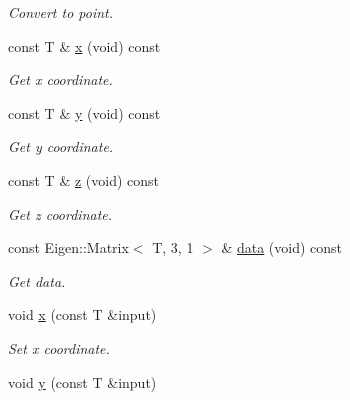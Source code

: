 \begin{DoxyCompactItemize}
\begin{DoxyCompactList}\small\item\em Convert to point. \end{DoxyCompactList}\item 
\mbox{\label{classddd_1_1row_object_a29439db5bbde399481c341cb66b7973e}} 
const T \& \hyperlink{classddd_1_1row_object_a29439db5bbde399481c341cb66b7973e}{x} (void) const
\begin{DoxyCompactList}\small\item\em Get x coordinate. \end{DoxyCompactList}\item 
\mbox{\label{classddd_1_1row_object_adac0d72ea44ad43b82f47b7a26010e4e}} 
const T \& \hyperlink{classddd_1_1row_object_adac0d72ea44ad43b82f47b7a26010e4e}{y} (void) const
\begin{DoxyCompactList}\small\item\em Get y coordinate. \end{DoxyCompactList}\item 
\mbox{\label{classddd_1_1row_object_a8d1d3c3217a0ac951f90e39d980faef4}} 
const T \& \hyperlink{classddd_1_1row_object_a8d1d3c3217a0ac951f90e39d980faef4}{z} (void) const
\begin{DoxyCompactList}\small\item\em Get z coordinate. \end{DoxyCompactList}\item 
\mbox{\label{classddd_1_1row_object_a30e3d89f19ec4001c9e70d0faaa6c579}} 
const Eigen\+::\+Matrix$<$ T, 3, 1 $>$ \& \hyperlink{classddd_1_1row_object_a30e3d89f19ec4001c9e70d0faaa6c579}{data} (void) const
\begin{DoxyCompactList}\small\item\em Get data. \end{DoxyCompactList}\item 
void \hyperlink{classddd_1_1row_object_afe92fca2bf490cdef9b684bd3847d7eb}{x} (const T \&input)
\begin{DoxyCompactList}\small\item\em Set x coordinate. \end{DoxyCompactList}\item 
void \hyperlink{classddd_1_1row_object_aeb7d81b5fcffd7d8a17fea5b85c37b43}{y} (const T \&input)

\end{DoxyCompactItemize}
